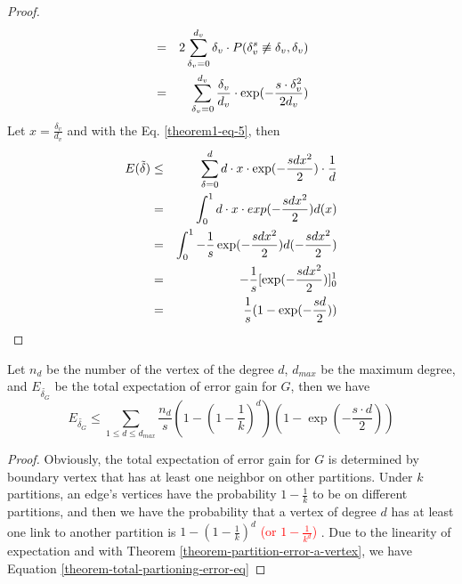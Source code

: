 \documentclass{sig-alternate-2013}
\begin{document}
\begin{proof}
\begin{eqnarray}
&=& 2\sum_{\delta_v=0}^{d_v} {\delta_v \cdot P( \delta_v^s \not\equiv \delta_v, \delta_v) } \notag \\
&=& \sum_{\delta_v=0}^{d_v} { \frac{\delta_v}{d_v} \cdot \exp(-\frac{s\cdot \delta_v^2}{2d_v})}
\end{eqnarray}
Let $x=\frac{\delta_v}{d_v}$ and with the Eq. \eqref{theorem1-eq-5}, then 
\begin{eqnarray}
E(\tilde\delta) &\leq& \sum_{\delta=0}^{d} {d\cdot x\cdot \exp(-\frac{s d x^2}{2})\cdot \frac{1}{d}} \notag\\
&=& \int_0^{1} {d \cdot x \cdot exp(-\frac{s d x^2}{2})} d(x)\notag \\
&=& \int_0^{1} {-\frac{1}{s} \exp(-\frac{s d x^2}{2})d(-\frac{s d x^2}{2})} \notag \\
&=& -\frac{1}{s} [\exp(-\frac{s d x^2}{2})]_0^{1} \notag \\
&=& \frac{1}{s} (1-\exp(-\frac{s d}{2})) \notag
\end{eqnarray}
\end{proof}

\begin{theorem}\label{theorm-total-partioning-error}
 Let $n_d$ be the number of the vertex of the degree $d$, $d_{max}$ be the maximum degree, and $E_{\tilde{\delta_G}}$ be the total expectation of error gain for $G$, then we have
\begin{equation}\label{theorem-total-partioning-error-eq}
E_{\tilde{\delta_G}} \leq \sum_{1\leq d\leq d_{max}} {\frac{n_d}{s} (1-(1-\frac{1}{k})^d) (1-\exp(-\frac{s\cdot d}{2}))}
\end{equation}
\end{theorem}
\begin{proof}
Obviously, the total expectation of error gain for $G$  is determined by boundary vertex that has at least one neighbor on other partitions. Under $k$ partitions, an edge's  vertices have the probability $1-\frac{1}{k}$ to be on different partitions, and then we have the probability that a vertex of degree $d$ has at least one link to another partition is $1-(1-\frac{1}{k})^d$ \textcolor{red}{(or $1-\frac{1}{k^d}$)} . Due to the linearity of expectation and with Theorem \ref{theorem-partition-error-a-vertex}, we have Equation \ref{theorem-total-partioning-error-eq}
\end{proof}
\end{document}
